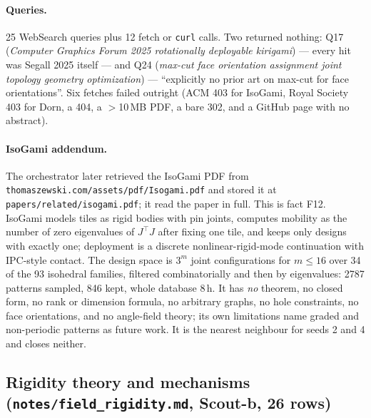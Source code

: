 \documentclass[10pt,a4paper]{article}
\newcommand{\fn}[1]{\nolinkurl{#1}}
\begin{document}
\paragraph{Queries.} 25 WebSearch queries plus 12 fetch or \texttt{curl} calls. Two returned
nothing: Q17 (\emph{Computer Graphics Forum 2025 rotationally deployable kirigami}) --- every
hit was Segall 2025 itself --- and Q24 (\emph{max-cut face orientation assignment joint topology
geometry optimization}) --- ``explicitly no prior art on max-cut for face orientations''.
Six fetches failed outright (ACM 403 for IsoGami, Royal Society 403 for Dorn, a 404, a
$>$10\,MB PDF, a bare 302, and a GitHub page with no abstract).

\paragraph{IsoGami addendum.} The orchestrator later retrieved the IsoGami PDF from
\fn{thomaszewski.com/assets/pdf/Isogami.pdf} and stored it at \fn{papers/related/isogami.pdf};
it read the paper in full. This is fact F12. IsoGami models tiles as rigid bodies with pin
joints, computes mobility as the number of zero eigenvalues of $J^{\!\top}J$ after fixing one
tile, and keeps only designs with exactly one; deployment is a discrete nonlinear-rigid-mode
continuation with IPC-style contact. The design space is $3^m$ joint configurations for
$m\le 16$ over 34 of the 93 isohedral families, filtered combinatorially and then by
eigenvalues: 2787 patterns sampled, 846 kept, whole database 8\,h. It has \emph{no} theorem,
no closed form, no rank or dimension formula, no arbitrary graphs, no hole constraints, no
face orientations, and no angle-field theory; its own limitations name graded and non-periodic
patterns as future work. It is the nearest neighbour for seeds 2 and 4 and closes neither.

\subsection{Rigidity theory and mechanisms (\texttt{notes/field\_rigidity.md}, Scout-b, 26 rows)}
\end{document}
